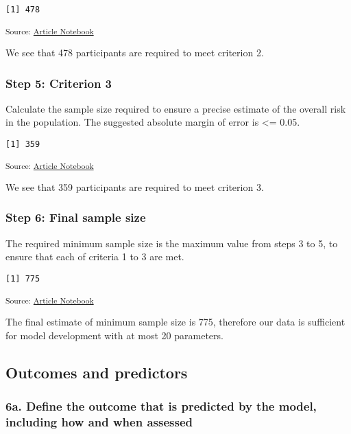 \documentclass[
  letterpaper,
  DIV=11,
  numbers=noendperiod]{scrartcl}
\begin{document}
\begin{verbatim}
[1] 478
\end{verbatim}

\textsubscript{Source:
\href{https://AnTangQuoc.github.io/LZD-TP-pred-model/index.qmd.html}{Article
Notebook}}

We see that 478 participants are required to meet criterion 2.

\subsubsection{Step 5: Criterion 3}\label{step-5-criterion-3}

Calculate the sample size required to ensure a precise estimate of the
overall risk in the population. The suggested absolute margin of error
is \textless= 0.05.

\begin{verbatim}
[1] 359
\end{verbatim}

\textsubscript{Source:
\href{https://AnTangQuoc.github.io/LZD-TP-pred-model/index.qmd.html}{Article
Notebook}}

We see that 359 participants are required to meet criterion 3.

\subsubsection{Step 6: Final sample
size}\label{step-6-final-sample-size}

The required minimum sample size is the maximum value from steps 3 to 5,
to ensure that each of criteria 1 to 3 are met.

\begin{verbatim}
[1] 775
\end{verbatim}

\textsubscript{Source:
\href{https://AnTangQuoc.github.io/LZD-TP-pred-model/index.qmd.html}{Article
Notebook}}

The final estimate of minimum sample size is 775, therefore our data is
sufficient for model development with at most 20 parameters.

\subsection{Outcomes and predictors}\label{sec-outcomes-and-predictors}

\subsubsection{6a. Define the outcome that is predicted by the model,
including how and when
assessed}\label{a.-define-the-outcome-that-is-predicted-by-the-model-including-how-and-when-assessed}
\end{document}
